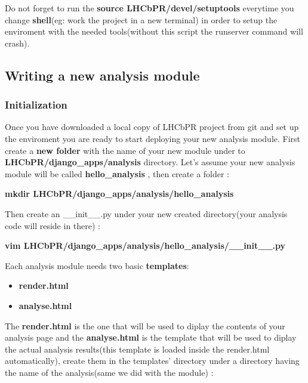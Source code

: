 \documentclass{lhcbnote}
\begin{document}
\vspace{2 mm}

Do not forget to run the {\bf source LHCbPR/devel/setuptools} everytime you change {\bf shell}(eg: work the project in a new terminal) 
in order to setup the enviroment with the needed tools(without this script the runserver command will crash).

\subsection{Writing a new analysis module}

\subsubsection{Initialization}

Once you have downloaded a local copy of LHCbPR project from git and set up the enviroment you are ready to start deploying your new analysis module.
First create a {\bf new folder} with the name of your new module under to {\bf LHCbPR/django\_apps/analysis} directory. Let's assume your new analysis module will be called {\bf hello\_analysis} , then create a folder :

\vspace{2 mm}

{\bf mkdir LHCbPR/django\_apps/analysis/hello\_analysis}

\vspace{2 mm}

Then create an \_\_init\_\_.py under your new created directory(your analysis code will reside in there) :

\vspace{2 mm}

{\bf vim LHCbPR/django\_apps/analysis/hello\_analysis/\_\_init\_\_.py}

\vspace{4 mm}

Each analysis module needs two basic {\bf templates}:
 \begin{itemize}
\item
{\bf render.html}
\item
{\bf analyse.html}
\end{itemize}

The {\bf render.html} is the one that will be used to diplay the contents of your analysis page
and the {\bf analyse.html} is the template that will be used to diplay the actual analysis results(this template is loaded inside the render.html automatically), 
create them in the templates' directory under a directory having the name of the analysis(same we did with the module) :
\end{document}
